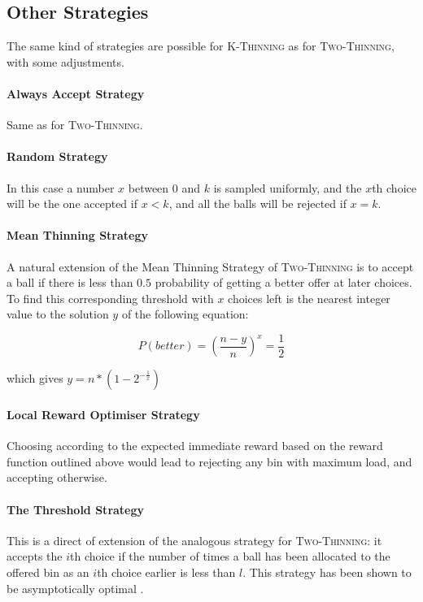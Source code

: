 \subsection{Other Strategies}

The same kind of strategies are possible for \textsc{K-Thinning} as for \textsc{Two-Thinning}, with some adjustments.

\paragraph{Always Accept Strategy} Same as for \textsc{Two-Thinning}.


\paragraph{Random Strategy} In this case a number $x$ between $0$ and $k$ is sampled uniformly, and the $x$th choice will be the one accepted if $x<k$, and all the balls will be rejected if $x=k$.



\paragraph{Mean Thinning Strategy} A natural extension of the Mean Thinning Strategy of \textsc{Two-Thinning} is to accept a ball if there is less than $0.5$ probability of getting a better offer at later choices. To find this corresponding threshold with $x$ choices left is the nearest integer value to the solution $y$ of the following equation:

\begin{equation} \label{meankthinning}
    P(better) = (\frac{n-y}{n})^x=\frac{1}{2}
\end{equation}

which gives $y = n * (1 - 2^{-\frac{1}{x}})$


\paragraph{Local Reward Optimiser Strategy} Choosing according to the expected immediate reward based on the reward function outlined above would lead to rejecting any bin with maximum load, and accepting otherwise.


\paragraph{The Threshold Strategy} This is a direct of extension of the analogous strategy for \textsc{Two-Thinning}: it accepts the $i$th choice if the number of times a ball has been allocated to the offered bin as an $i$th choice earlier is less than $l$. This strategy has been shown to be asymptotically optimal \cite{feldheim2020dthinning}.



